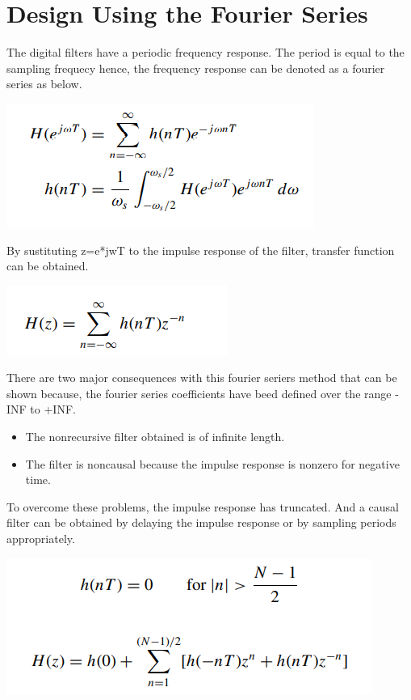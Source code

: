 \documentclass[oneside,11pt,onecolumn,a4paper]{report}
\begin{document}
\section{Design Using the Fourier Series}

\hspace{4em}The digital filters have a periodic frequency response. The period is equal to the sampling frequecy hence, the frequency response can be denoted as a fourier series as below.

\includegraphics{Screenshot (165)}

By sustituting z=e*jwT to the impulse response of the filter, transfer function can be obtained.

\includegraphics{Screenshot (174)}

There are two major consequences with this fourier seriers method that can be shown because, the fourier series coefficients have beed defined over the range -INF to +INF.
\begin{itemize}
  \item The nonrecursive filter obtained is of infinite length.
  \item The filter is noncausal because the impulse response is nonzero for negative time.
\end{itemize}

To overcome these problems, the impulse response has truncated. And a causal filter can be obtained by delaying the impulse response or by sampling periods appropriately.


\includegraphics{Screenshot (166)}
\end{document}
